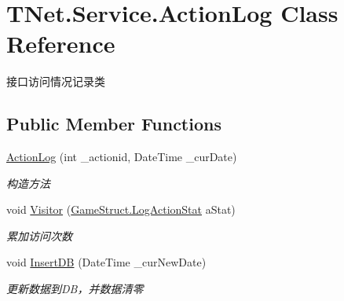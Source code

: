 \hypertarget{class_t_net_1_1_service_1_1_action_log}{}\section{T\+Net.\+Service.\+Action\+Log Class Reference}
\label{class_t_net_1_1_service_1_1_action_log}


接口访问情况记录类  


\subsection*{Public Member Functions}
\begin{DoxyCompactItemize}
\item 
\mbox{\hyperlink{class_t_net_1_1_service_1_1_action_log_a9123f4bf9b56a7b221548c8fb278218e}{Action\+Log}} (int \+\_\+actionid, Date\+Time \+\_\+cur\+Date)
\begin{DoxyCompactList}\small\item\em 构造方法 \end{DoxyCompactList}\item 
void \mbox{\hyperlink{class_t_net_1_1_service_1_1_action_log_a49f7ab0ff5ad120f8314f165d771c68b}{Visitor}} (\mbox{\hyperlink{class_t_net_1_1_service_1_1_game_struct_ac7fb463ce72bdf0b12b015c74d2d58da}{Game\+Struct.\+Log\+Action\+Stat}} a\+Stat)
\begin{DoxyCompactList}\small\item\em 累加访问次数 \end{DoxyCompactList}\item 
void \mbox{\hyperlink{class_t_net_1_1_service_1_1_action_log_ade384532839712937b50312c3a0a5920}{Insert\+DB}} (Date\+Time \+\_\+cur\+New\+Date)
\begin{DoxyCompactList}\small\item\em 更新数据到\+D\+B，并数据清零 \end{DoxyCompactList}\end{DoxyCompactItemize}
